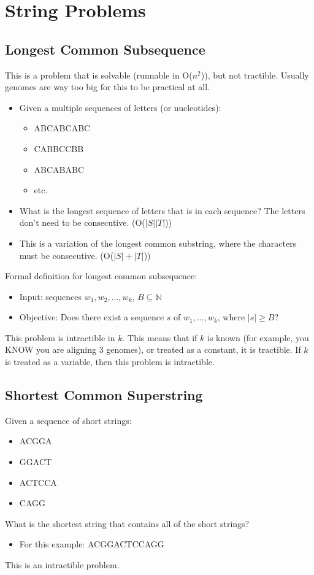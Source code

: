 \documentclass[10pt]{article}
\begin{document}
\section*{String Problems}
\subsection*{Longest Common Subsequence}
This is a problem that is solvable (runnable in O($n^2$)), but not tractible.  Usually genomes are way too big for this to be practical at all.
\begin{itemize}
	\item Given a multiple sequences of letters (or nucleotides):
	\begin{itemize}
	    \item ABCABCABC
	    \item CABBCCBB
	    \item ABCABABC
	    \item etc.
    \end{itemize}
    \item What is the longest sequence of letters that is in each sequence?  The letters don't need to be consecutive.  (O($|S||T|$))
    \item This is a variation of the longest common substring, where the characters must be consecutive.  (O($|S| + |T|$))
\end{itemize}
Formal definition for longest common subsequence:
\begin{itemize}
	\item Input: sequences $w_1, w_2, \dots, w_k$, $B \subseteq \mathbb{N}$
	\item Objective: Does there exist a sequence $s$ of $w_1, \dots, w_k$, where $|s| \geq B$?
\end{itemize}
This problem is intractible in $k$.  This means that if $k$ is known (for example, you KNOW you are aligning 3 genomes), or treated as a constant, it is tractible.  If $k$ is treated as a variable, then this problem is intractible.

\subsection*{Shortest Common Superstring}
Given a sequence of short strings:
\begin{itemize}
	\item ACGGA
	\item GGACT
	\item ACTCCA
	\item CAGG
\end{itemize}
What is the shortest string that contains all of the short strings?
\begin{itemize}
	\item For this example: ACGGACTCCAGG
\end{itemize}
This is an intractible problem.
\end{document}
